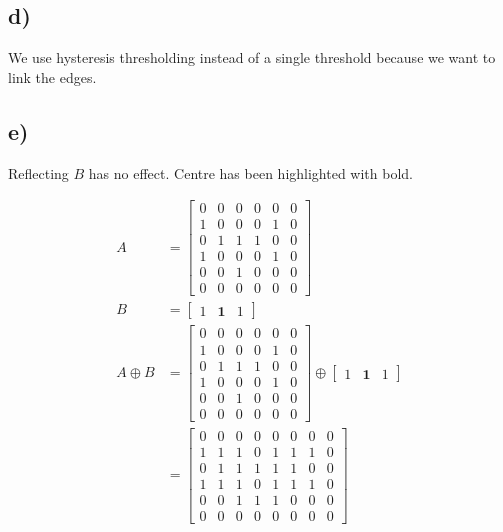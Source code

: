 \subsection*{d)}
We use hysteresis thresholding instead of a single threshold because we want to link the edges. 

\subsection*{e)}
Reflecting $B$ has no effect. Centre has been highlighted with bold. 

\begin{align*}
    A &= \begin{bmatrix}
        0 & 0 & 0 & 0 & 0 & 0 \\
        1 & 0 & 0 & 0 & 1 & 0 \\ 
        0 & 1 & 1 & 1 & 0 & 0 \\ 
        1 & 0 & 0 & 0 & 1 & 0 \\ 
        0 & 0 & 1 & 0 & 0 & 0 \\ 
        0 & 0 & 0 & 0 & 0 & 0 
    \end{bmatrix} \\ 
    B &= \begin{bmatrix}
        1 & \mathbf{1} & 1
    \end{bmatrix} \\ 
    A \oplus B &= \begin{bmatrix}
        0 & 0 & 0 & 0 & 0 & 0 \\
        1 & 0 & 0 & 0 & 1 & 0 \\ 
        0 & 1 & 1 & 1 & 0 & 0 \\ 
        1 & 0 & 0 & 0 & 1 & 0 \\ 
        0 & 0 & 1 & 0 & 0 & 0 \\ 
        0 & 0 & 0 & 0 & 0 & 0 
    \end{bmatrix} \oplus \begin{bmatrix}
        1 & \mathbf{1} & 1
    \end{bmatrix} \\ 
    &= \begin{bmatrix}
        0 & 0 & 0 & 0 & 0 & 0 & 0 & 0 \\
        1 & 1 & 1 & 0 & 1 & 1 & 1 & 0 \\
        0 & 1 & 1 & 1 & 1 & 1 & 0 & 0 \\ 
        1 & 1 & 1 & 0 & 1 & 1 & 1 & 0 \\ 
        0 & 0 & 1 & 1 & 1 & 0 & 0 & 0 \\ 
        0 & 0 & 0 & 0 & 0 & 0 & 0 & 0 
    \end{bmatrix}
\end{align*}




